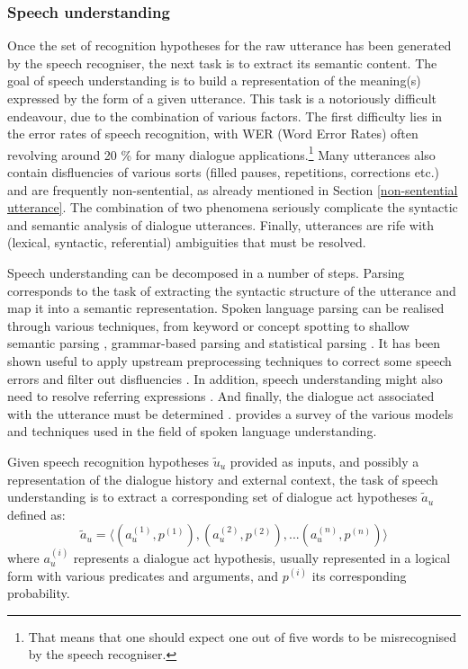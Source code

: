 \subsubsection*{Speech understanding}

Once the set of recognition hypotheses for the raw utterance has been generated by the speech recogniser, the next task is to extract its semantic content.  The goal of speech understanding is to build a representation of the meaning(s) expressed by the form of a given utterance.  This task is a notoriously difficult endeavour, due to the combination of various factors. The first difficulty lies in the error rates of speech recognition, with WER (Word Error Rates) often revolving around 20 \% for many dialogue applications.\footnote{That means that one should expect one out of five words to be misrecognised by the speech recogniser.}  Many utterances also contain disfluencies of various sorts (filled pauses, repetitions, corrections etc.) and are frequently non-sentential, as already mentioned in Section \ref{non-sentential utterance}.  The combination of two phenomena seriously complicate the syntactic and semantic analysis of dialogue utterances. Finally, utterances are rife with (lexical, syntactic, referential) ambiguities that must be resolved. 

Speech understanding can be decomposed in a number of steps.  Parsing corresponds to the task of extracting the syntactic structure of the utterance and map it into a semantic representation.  Spoken language parsing can be realised through various techniques, from keyword or concept spotting \citep{ZhangZY07,KomataniTKK01} to shallow semantic parsing \citep{Coppola:2009}, grammar-based parsing \citep{VanNoord1999} and statistical parsing \citep{He200585}.  It has been shown useful to apply upstream preprocessing techniques to correct some speech errors \citep{Ringger:1996} and filter out disfluencies \citep{Johnson:2004}. In addition, speech understanding might also need to resolve referring expressions \citep{Funakoshi:2012}.  And finally, the dialogue act associated with the utterance must be determined \citep{stolcke2000,Keizer2007}. \cite{demori2008} provides a survey of the various models and techniques used in the field of spoken language understanding. 

Given speech recognition hypotheses $\tilde{u}_u$ provided as inputs, and possibly a representation of the dialogue history and external context, the task of speech understanding is to extract a corresponding set of dialogue act hypotheses $\tilde{a}_u$ defined as: \begin{equation*}
\tilde{a}_u = \langle (a_u^{(1)}, p^{(1)}), (a_u^{(2)}, p^{(2)}), ... (a_u^{(n)}, p^{(n)})\rangle
\end{equation*}
where $a_u^{(i)}$ represents a dialogue act hypothesis, usually represented in a logical form with various predicates and arguments, and $p^{(i)}$ its corresponding probability.

